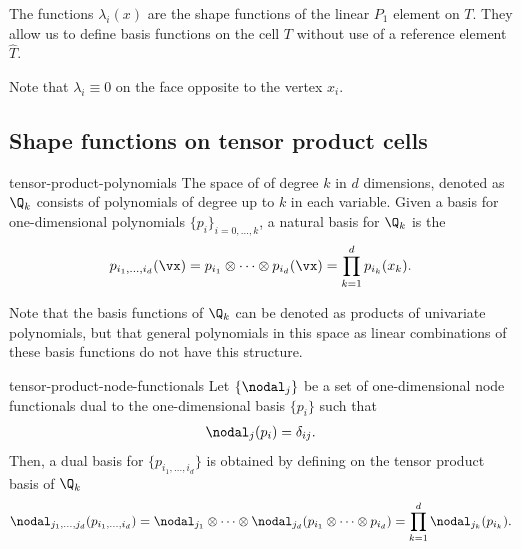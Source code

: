 \begin{remark}
  The functions $\lambda_i(x)$ are the shape functions of the linear
  $P_1$ element on $T$. They allow us to define basis functions on the
  cell $T$ without use of a reference element $\widehat T$.

  Note that $\lambda_i\equiv 0$ on the face opposite to the
  vertex $x_i$.
\end{remark}

\subsection{Shape functions on tensor product cells}

\begin{Definition}{tensor-product-polynomials}
  The space of  of degree $k$ in
  $d$ dimensions, denoted as $\Q_k$ consists of polynomials of degree
  up to $k$ in each variable. Given a basis for one-dimensional
  polynomials $\{p_i\}_{i=0,\dots,k}$, a natural basis for $\Q_k$ is
  the 
  \begin{gather}
    \label{eq:fem-intro:1}
    p_{i_1,\dots,i_d}(\vx)
    = p_{i_1}\otimes \dots\otimes p_{i_d}(\vx)
    = \prod_{k=1}^d p_{i_k}(x_k).
  \end{gather}
\end{Definition}

\begin{remark}
  Note that the basis functions of $\Q_k$ can be denoted as products
  of univariate polynomials, but that general polynomials in this
  space as linear combinations of these basis functions do not have
  this structure.
\end{remark}

\begin{Lemma}{tensor-product-node-functionals}
  Let $\{\nodal_j\}$ be a set of one-dimensional node functionals dual
  to the one-dimensional basis $\{p_i\}$ such that
  \begin{gather}
    \nodal_j(p_i) = \delta_{ij}.
  \end{gather}
  Then, a dual basis for $\{p_{i_1,\dots,i_d}\}$ is obtained by
  defining on the tensor product basis of $\Q_k$
  \begin{gather}
    \label{eq:fem-intro:2}
    \nodal_{j_1,\dots,j_d}(p_{i_1,\dots,i_d})
    = \nodal_{j_1} \otimes \dots\otimes \nodal_{j_d}(p_{i_1}\otimes\dots\otimes p_{i_d})
    = \prod_{k=1}^d \nodal_{j_k}(p_{i_k}).
  \end{gather}
\end{Lemma}

